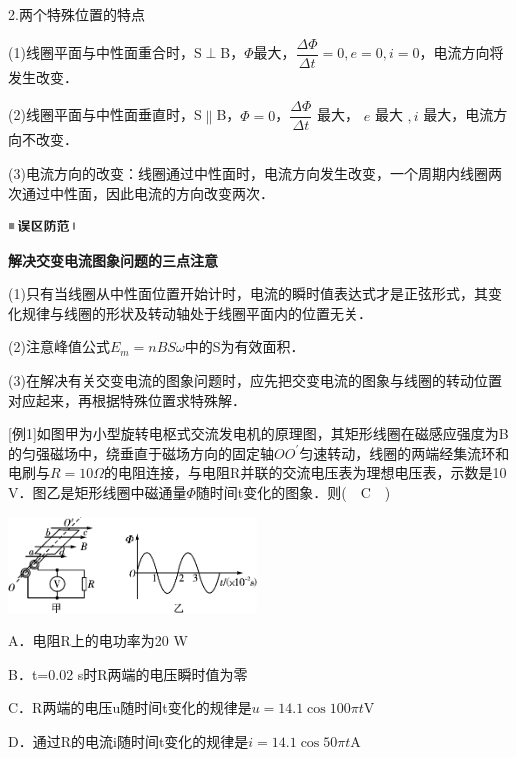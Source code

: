 2.两个特殊位置的特点

(1)线圈平面与中性面重合时，S$\perp$B，$\Phi$最大，$\dfrac{\Delta \Phi}{\Delta t}=0, e=0, i=0$，电流方向将发生改变．

(2)线圈平面与中性面垂直时，S$\parallel$B，$\Phi=0$，$\dfrac{\Delta \Phi}{\Delta t}$ 最大， $e$ 最大 $, i$ 最大，电流方向不改变．

(3)电流方向的改变：线圈通过中性面时，电流方向发生改变，一个周期内线圈两次通过中性面，因此电流的方向改变两次．

\begin{center}\includegraphics[width=0.70764in,height=0.12292in]{media/image34.png}\end{center}
\begin{center}
	\textbf{解决交变电流图象问题的三点注意}
\end{center}

(1)只有当线圈从中性面位置开始计时，电流的瞬时值表达式才是正弦形式，其变化规律与线圈的形状及转动轴处于线圈平面内的位置无关．

(2)注意峰值公式$E_m=nBS\omega$中的S为有效面积．

(3)在解决有关交变电流的图象问题时，应先把交变电流的图象与线圈的转动位置对应起来，再根据特殊位置求特殊解．

{[}例1{]}如图甲为小型旋转电枢式交流发电机的原理图，其矩形线圈在磁感应强度为B的匀强磁场中，绕垂直于磁场方向的固定轴$OO^\prime$匀速转动，线圈的两端经集流环和电刷与$R=10\Omega$的电阻连接，与电阻R并联的交流电压表为理想电压表，示数是10
V．图乙是矩形线圈中磁通量$\Phi$随时间t变化的图象．则(　C　)

\begin{center}\includegraphics[width=2.59444in,height=1in]{media/image443.png}\end{center}

A．电阻R上的电功率为20 W

B．t=0.02 s时R两端的电压瞬时值为零

C．R两端的电压u随时间t变化的规律是$u=14.1\cos 100\pi t $V

D．通过R的电流i随时间t变化的规律是$i=14.1\cos 50\pi t $A

